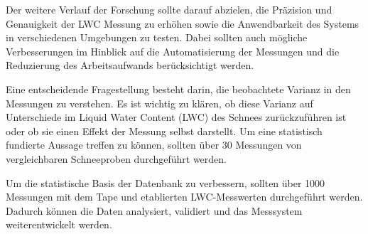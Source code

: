 Der weitere Verlauf der Forschung sollte darauf abzielen, die Präzision und Genauigkeit der LWC Messung  zu erhöhen sowie die Anwendbarkeit des Systems in verschiedenen Umgebungen zu testen. Dabei sollten auch mögliche Verbesserungen im Hinblick auf die Automatisierung der Messungen und die Reduzierung des Arbeitsaufwands berücksichtigt werden.

Eine entscheidende Fragestellung besteht darin, die beobachtete Varianz in den Messungen zu verstehen. Es ist wichtig zu klären, ob diese Varianz auf Unterschiede im Liquid Water Content (LWC) des Schnees zurückzuführen ist oder ob sie einen Effekt der Messung selbst darstellt. Um eine statistisch fundierte Aussage treffen zu können, sollten über 30 Messungen von vergleichbaren Schneeproben durchgeführt werden.

Um die statistische Basis der Datenbank zu verbessern, sollten über 1000 Messungen mit dem Tape und etablierten LWC-Messwerten durchgeführt werden. Dadurch können die Daten analysiert, validiert und das Messsystem weiterentwickelt werden.
